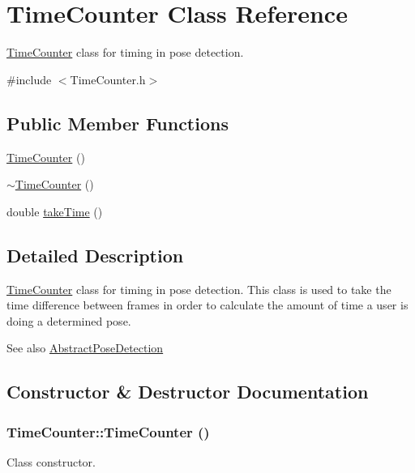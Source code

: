 \hypertarget{classTimeCounter}{
\section{TimeCounter Class Reference}
\label{classTimeCounter}
}


\hyperlink{classTimeCounter}{TimeCounter} class for timing in pose detection.  




{\ttfamily \#include $<$TimeCounter.h$>$}

\subsection*{Public Member Functions}
\begin{DoxyCompactItemize}
\item 
\hyperlink{classTimeCounter_a2be677c8281f27c4dffd29c7f2ca6e7e}{TimeCounter} ()
\item 
\hyperlink{classTimeCounter_aa8790b82b41f08d9823700060f7a01dc}{$\sim$TimeCounter} ()
\item 
double \hyperlink{classTimeCounter_af579a764cbad73c606938f5c12b1776e}{takeTime} ()
\end{DoxyCompactItemize}


\subsection{Detailed Description}
\hyperlink{classTimeCounter}{TimeCounter} class for timing in pose detection. This class is used to take the time difference between frames in order to calculate the amount of time a user is doing a determined pose.

\begin{DoxySeeAlso}{See also}
\hyperlink{classAbstractPoseDetection}{AbstractPoseDetection} 
\end{DoxySeeAlso}


\subsection{Constructor \& Destructor Documentation}
\hypertarget{classTimeCounter_a2be677c8281f27c4dffd29c7f2ca6e7e}{
\subsubsection[{TimeCounter}]{\setlength{\rightskip}{0pt plus 5cm}TimeCounter::TimeCounter ()}}
\label{classTimeCounter_a2be677c8281f27c4dffd29c7f2ca6e7e}
Class constructor.


